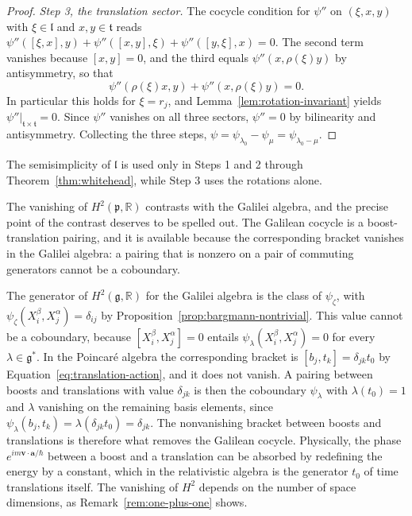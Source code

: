 \begin{proof}
		\emph{Step 3, the translation sector.} The cocycle condition for $\psi''$ on $(\xi,x,y)$ with $\xi\in\mathfrak{l}$ and $x,y\in\mathfrak{t}$ reads $\psi''([\xi,x],y)+\psi''([x,y],\xi)+\psi''([y,\xi],x)=0$. The second term vanishes because $[x,y]=0$, and the third equals $\psi''(x,\rho(\xi)y)$ by antisymmetry, so that
		\begin{equation*}
			\psi''(\rho(\xi)x,y)+\psi''(x,\rho(\xi)y)=0.
		\end{equation*}
		In particular this holds for $\xi=r_j$, and Lemma~\ref{lem:rotation-invariant} yields $\psi''|_{\mathfrak{t}\times\mathfrak{t}}=0$. Since $\psi''$ vanishes on all three sectors, $\psi''=0$ by bilinearity and antisymmetry. Collecting the three steps, $\psi=\psi_{\lambda_0}-\psi_\mu=\psi_{\lambda_0-\mu}$.
	\end{proof}
	
	\noindent The semisimplicity of $\mathfrak{l}$ is used only in Steps 1 and 2 through Theorem~\ref{thm:whitehead}, while Step 3 uses the rotations alone.
	
	The vanishing of $H^2(\mathfrak{p},\mathbb{R})$ contrasts with the Galilei algebra, and the precise point of the contrast deserves to be spelled out. The Galilean cocycle is a boost-translation pairing, and it is available because the corresponding bracket vanishes in the Galilei algebra: a pairing that is nonzero on a pair of commuting generators cannot be a coboundary.
	
	\begin{remark}\label{rem:cohomology-comparison}
		The generator of $H^2(\mathfrak{g},\mathbb{R})$ for the Galilei algebra is the class of $\psi_\zeta$, with $\psi_\zeta(X^\beta_i,X^\alpha_j)=\delta_{ij}$ by Proposition~\ref{prop:bargmann-nontrivial}. This value cannot be a coboundary, because $[X^\beta_i,X^\alpha_j]=0$ entails $\psi_\lambda(X^\beta_i,X^\alpha_j)=0$ for every $\lambda\in\mathfrak{g}^*$. In the Poincar\'e algebra the corresponding bracket is $[b_j,t_k]=\delta_{jk}t_0$ by Equation~\eqref{eq:translation-action}, and it does not vanish. A pairing between boosts and translations with value $\delta_{jk}$ is then the coboundary $\psi_\lambda$ with $\lambda(t_0)=1$ and $\lambda$ vanishing on the remaining basis elements, since $\psi_\lambda(b_j,t_k)=\lambda(\delta_{jk}t_0)=\delta_{jk}$. The nonvanishing bracket between boosts and translations is therefore what removes the Galilean cocycle. Physically, the phase $e^{im\mathbf{v}\cdot\mathbf{a}/\hbar}$ between a boost and a translation can be absorbed by redefining the energy by a constant, which in the relativistic algebra is the generator $t_0$ of time translations itself. The vanishing of $H^2$ depends on the number of space dimensions, as Remark~\ref{rem:one-plus-one} shows.
	\end{remark}
	
